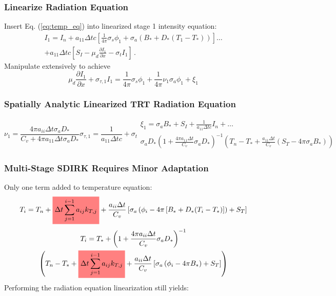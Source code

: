 \documentclass{beamer}
\newcommand{\highlight}[1]{%
  \colorbox{red!50}{$\displaystyle#1$}}
\newcommand{\be}{\begin{equation*}}   %
\newcommand{\ee}{\end{equation*}}
\newcommand{\benum}{\begin{equation}}   %
\newcommand{\eenum}{\end{equation}}
\newcommand{\eqt}[1]{Eq. (\ref{#1})}  %
\newcommand{\pep}{\, .}
\begin{document}
\begin{frame}
\frametitle{Linearize Radiation Equation}
Insert \eqt{eq:temp_eq} into linearized stage 1 intensity equation:
\begin{multline*}
I_1 = I_n + a_{11} \Delta t c \left[ \frac{1}{4\pi}\sigma_{s} \phi_1 + \sigma_a \left(B_* + D_*(T_1 - T_*)  \right) \right]\dots \\ 
+ a_{11} \Delta t c\left[ S_I - \mu_d \frac{\partial I_1}{\partial x} - \sigma_t I_1 \right] \pep
\end{multline*}
Manipulate  extensively to achieve
\benum
\mu_d \frac{\partial I_1}{\partial x} + \sigma_{\tau,1}I_1 = \frac{1}{4\pi} \sigma_s \phi_1 + \frac{1}{4\pi}\nu_1 \sigma_a \phi_1 + \xi_1 
\label{eq:analytic_pseudo_i}
\eenum
\end{frame}

\begin{frame}
\frametitle{Spatially Analytic Linearized TRT Radiation Equation}
\begin{subequations}
\benum
\nu_1 = \frac{ 4\pi a_{ii} \Delta t \sigma_a D_*}{C_v + 4\pi a_{11} \Delta t  \sigma_a D_*} 
\label{eq:analytic_nu}
\eenum
\benum
\sigma_{\tau,1} = \frac{1}{a_{11} \Delta t c} + \sigma_t 
\label{eq:tau_i_analytic}
\eenum
\begin{multline}
\xi_1 = \sigma_a B_* + S_I +  \frac{1}{a_{11} \Delta t c} I_n  + \dots  \\ 
\sigma_a D_*\left(1 + \frac{4\pi a_{11} \Delta t}{C_v} \sigma_a D_*  \right)^{-1} 
\left( T_n - T_* +  \frac{a_{11} \Delta t }{C_v}  \left( S_T -  4\pi  \sigma_a B_*   \right) \right) 
\end{multline}
\end{subequations}
\end{frame}

\begin{frame}
\frametitle{Multi-Stage SDIRK Requires Minor Adaptation}
Only one term added to temperature equation:
\be
T_i = T_n + \highlight{ \Delta t \sum_{j=1}^{i-1}{a_{ij} k_{T,j}} } + \frac{a_{ii} \Delta t }{C_v} \left[ \sigma_a \left( \phi_i - 4\pi \left[ B_* + D_*(T_i - T_*) \right] \right) + S_T  \right] 
\ee
\begin{multline*}
T_i = T_* + \left(1 + \frac{4\pi a_{ii} \Delta t}{C_v} \sigma_a D_*  \right)^{-1} \\
\left( T_n - T_* + \highlight{ \Delta t \sum_{j=1}^{i-1}{a_{ij} k_{T,j}} } +  \frac{a_{ii} \Delta t }{C_v} \left[ \sigma_a \left( \phi_i - 4\pi   B_* \right) + S_T \right]  \right)
\end{multline*}
Performing the radiation equation linearization still yields:
\end{frame}
\end{document}
